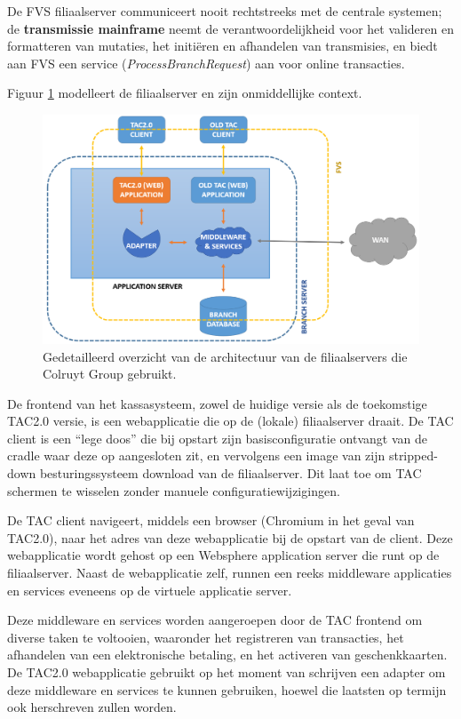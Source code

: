 De FVS filiaalserver communiceert nooit rechtstreeks met de centrale systemen; de \textbf{transmissie mainframe} neemt de verantwoordelijkheid voor het valideren en formatteren van mutaties, het initiëren en afhandelen van transmisies, en biedt aan FVS een service (\emph{ProcessBranchRequest}) aan voor online transacties.

Figuur \ref{fig:FVSDetail} modelleert de filiaalserver en zijn onmiddellijke context.

\begin{figure}[h!]
    \centering
    \includegraphics[scale=0.35]{img/func-omsch/DiagramLowerLevel.PNG}
    \caption{Gedetailleerd overzicht van de architectuur van de filiaalservers die Colruyt Group gebruikt.}
    \label{fig:FVSDetail}
\end{figure}

De frontend van het kassasysteem, zowel de huidige versie als de toekomstige TAC2.0 versie, is een webapplicatie die op de (lokale) filiaalserver draait. De TAC client is een ``lege doos'' die bij opstart zijn basisconfiguratie ontvangt van de cradle waar deze op aangesloten zit, en vervolgens een image van zijn stripped-down besturingssysteem download van de filiaalserver. Dit laat toe om TAC schermen te wisselen zonder manuele configuratiewijzigingen.

De TAC client navigeert, middels een browser (Chromium in het geval van TAC2.0), naar het adres van deze webapplicatie bij de opstart van de client. Deze webapplicatie wordt gehost op een Websphere application server die runt op de filiaalserver. Naast de webapplicatie zelf, runnen een reeks middleware applicaties en services eveneens op de virtuele applicatie server.

Deze middleware en services worden aangeroepen door de TAC frontend om diverse taken te voltooien, waaronder het registreren van transacties, het afhandelen van een elektronische betaling, en het activeren van geschenkkaarten. De TAC2.0 webapplicatie gebruikt op het moment van schrijven een adapter om deze middleware en services te kunnen gebruiken, hoewel die laatsten op termijn ook herschreven zullen worden.

